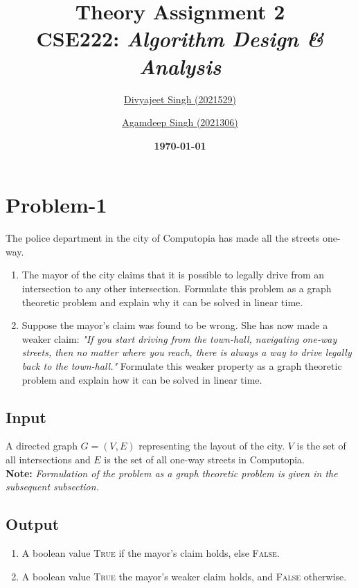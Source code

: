\documentclass[12pt]{report}
\title{
    \textbf{\Huge{Theory Assignment 2}} \\
    \vspace*{15pt}
    \large{CSE222: \textit{Algorithm Design \& Analysis}}
}
\author{
    \href{mailto:divyajeet21529@iiitd.ac.in}{Divyajeet Singh (2021529)}
    \and
    \href{mailto:agamdeep21306@iiitd.ac.in}{Agamdeep Singh (2021306)}
}
\date{
    \vspace*{10pt}
    \textbf{\today}
}
\begin{document}
    \maketitle

    \section*{\huge{Problem-1}}
    The police department in the city of Computopia has made all the streets one-way.
    \begin{enumerate}[label=(\alph*)]
        \item
        The mayor of the city claims that it is possible to legally drive from an intersection to any other intersection.
        Formulate this problem as a graph theoretic problem and explain why it can be solved in linear time.
        \item
        Suppose the mayor's claim was found to be wrong. She has now made a weaker claim:
        \textit{"If you start driving from the town-hall, navigating one-way streets, then no matter where you reach,
        there is always a way to drive legally back to the town-hall."}
        Formulate this weaker property as a graph theoretic problem and explain how it can be solved in linear time.
    \end{enumerate}

    \subsection*{Input}
    A directed graph $G = (V, E)$ representing the layout of the city.
    $V$ is the set of all intersections and $E$ is the set of all one-way streets in Computopia.
    \vspace*{7.5pt} \\
    \textbf{Note:} \textit{Formulation of the problem as a graph theoretic problem is given in the subsequent subsection.}

    \subsection*{Output}
    \begin{enumerate}[label=(\textbf{\alph*})]
        \item A boolean value \textsc{True} if the mayor's claim holds, else \textsc{False}.
        \item A boolean value \textsc{True} the mayor's weaker claim holds, and \textsc{False} otherwise.
    \end{enumerate}
\end{document}
